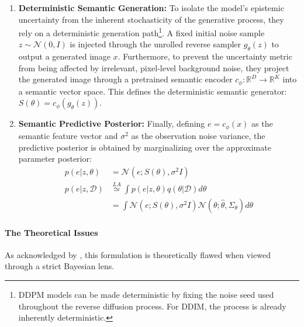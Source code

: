 \begin{enumerate}
    (Note: While \cite{jazbec_generative_2025} omit the $\gamma I$ term in their main text formulation, they explicitly use this prior in their implementation details).

    \item \textbf{Deterministic Semantic Generation:} To isolate the model's epistemic uncertainty from the inherent stochasticity of the generative process, they rely on a deterministic generation path\footnote{\acs{DDPM} models can be made deterministic by fixing the noise seed used throughout the reverse diffusion process. For \acs{DDIM}, the process is already inherently deterministic.}. A fixed initial noise sample $z \sim \mathcal{N}(0, I)$ is injected through the unrolled reverse sampler $g_\theta(z)$ to output a generated image $x$. Furthermore, to prevent the uncertainty metric from being affected by irrelevant, pixel-level background noise, they project the generated image through a pretrained semantic encoder $c_\phi : \mathbb{R}^D \rightarrow \mathbb{R}^K$ into a semantic vector space. This defines the deterministic semantic generator: $S(\theta) = c_\phi(g_\theta(z))$.

    \item \textbf{Semantic Predictive Posterior:} Finally, defining $e = c_\phi(x)$ as the semantic feature vector and $\sigma^2$ as the observation noise variance, the predictive posterior is obtained by marginalizing over the approximate parameter posterior:
    \begin{align}
        p(e | z, \theta) &= \mathcal{N}\left(e; S(\theta), \sigma^2 I\right)\\
        p(e | z, \mathcal{D}) &\overset{LA}{\simeq} \int p(e | z, \theta) q(\theta | \mathcal{D}) d\theta \\
        &= \int \mathcal{N}\left(e; S(\theta), \sigma^2 I\right) \mathcal{N}\left(\theta; \hat{\theta}, \Sigma_\theta\right) d\theta \nonumber
    \end{align}
\end{enumerate}

\paragraph{The Theoretical Issues}
As acknowledged by \cite{jazbec_generative_2025}, this formulation is theoretically flawed when viewed through a strict Bayesian lens. 

